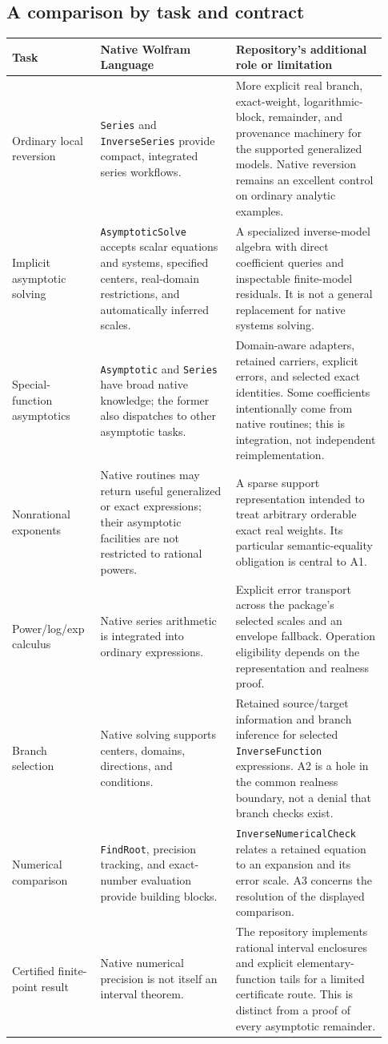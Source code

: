 \documentclass[11pt,letterpaper]{article}
\newcommand{\code}[1]{{\small\nolinkurl{#1}}}
\begin{document}
\clearpage
\subsection{A comparison by task and contract}
\begin{longtable}{@{}p{0.21\linewidth}p{0.34\linewidth}p{0.38\linewidth}@{}}
\toprule
Task & Native Wolfram Language & Repository's additional role or limitation\\\midrule
\endhead
Ordinary local reversion & \code{Series} and \code{InverseSeries} provide compact, integrated series workflows. & More explicit real branch, exact-weight, logarithmic-block, remainder, and provenance machinery for the supported generalized models. Native reversion remains an excellent control on ordinary analytic examples.\\[5pt]
Implicit asymptotic solving & \code{AsymptoticSolve} accepts scalar equations and systems, specified centers, real-domain restrictions, and automatically inferred scales. & A specialized inverse-model algebra with direct coefficient queries and inspectable finite-model residuals. It is not a general replacement for native systems solving.\\[5pt]
Special-function asymptotics & \code{Asymptotic} and \code{Series} have broad native knowledge; the former also dispatches to other asymptotic tasks. & Domain-aware adapters, retained carriers, explicit errors, and selected exact identities. Some coefficients intentionally come from native routines; this is integration, not independent reimplementation.\\[5pt]
Nonrational exponents & Native routines may return useful generalized or exact expressions; their asymptotic facilities are not restricted to rational powers. & A sparse support representation intended to treat arbitrary orderable exact real weights. Its particular semantic-equality obligation is central to A1.\\[5pt]
Power/log/exp calculus & Native series arithmetic is integrated into ordinary expressions. & Explicit error transport across the package's selected scales and an envelope fallback. Operation eligibility depends on the representation and realness proof.\\[5pt]
Branch selection & Native solving supports centers, domains, directions, and conditions. & Retained source/target information and branch inference for selected \code{InverseFunction} expressions. A2 is a hole in the common realness boundary, not a denial that branch checks exist.\\[5pt]
Numerical comparison & \code{FindRoot}, precision tracking, and exact-number evaluation provide building blocks. & \code{InverseNumericalCheck} relates a retained equation to an expansion and its error scale. A3 concerns the resolution of the displayed comparison.\\[5pt]
Certified finite-point result & Native numerical precision is not itself an interval theorem. & The repository implements rational interval enclosures and explicit elementary-function tails for a limited certificate route. This is distinct from a proof of every asymptotic remainder.\\
\bottomrule
\end{longtable}
\end{document}
